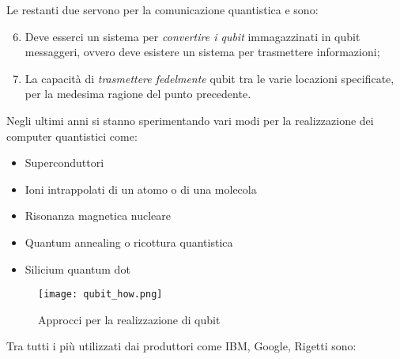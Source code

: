 Le restanti due servono per la comunicazione quantistica e sono:

\begin{enumerate}
  \setcounter{enumi}{5}
  \item Deve esserci un sistema per \textit{convertire i qubit} immagazzinati in qubit messaggeri, ovvero deve esistere un sistema per trasmettere informazioni;
  \item La capacità di \textit{trasmettere fedelmente} qubit tra le varie locazioni specificate, per la medesima ragione del punto precedente.
\end{enumerate}

Negli ultimi anni si stanno sperimentando vari modi per la realizzazione dei computer quantistici come:
\begin{itemize}
  \item Superconduttori
  \item Ioni intrappolati di un atomo o di una molecola
  \item Risonanza magnetica nucleare
  \item Quantum annealing o ricottura quantistica
  \item Silicium quantum dot
\end{itemize}

\begin{figure}[htbp]
  \centering
  \texttt{[image: qubit\_how.png]}
  \caption{Approcci per la realizzazione di qubit}
  \label{fig:qubit_how}
\end{figure}

Tra tutti i più utilizzati dai produttori come IBM, Google, Rigetti sono:

